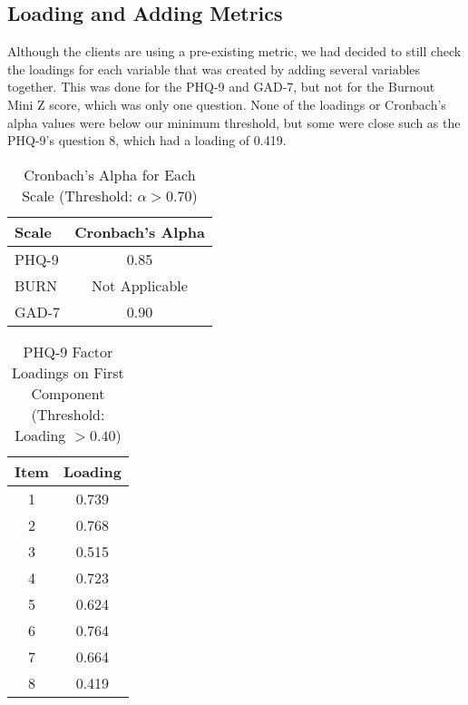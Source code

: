 \documentclass{article}
\begin{document}


\subsection{Loading and Adding Metrics}

Although the clients are using a pre-existing metric, we had decided to still check the loadings for each variable that was created by adding several variables together. This was done for the PHQ-9 and GAD-7, but not for the Burnout Mini Z score, which was only one question. None of the loadings or Cronbach's alpha values were below our minimum threshold, but some were close such as the PHQ-9's question 8, which had a loading of 0.419.

\renewcommand{\arraystretch}{1.2}
\begin{table}[H]
\centering
\caption{Cronbach's Alpha for Each Scale (Threshold: $\alpha > 0.70$)}
\begin{tabular}{|l|c|}
\hline
\textbf{Scale} & \textbf{Cronbach's Alpha} \\
\hline
PHQ-9 & 0.85 \\
BURN & Not Applicable \\
GAD-7 & 0.90 \\
\hline
\end{tabular}
\end{table}

\vspace{0.5cm}

\renewcommand{\arraystretch}{1.2}
\begin{table}[H]
\centering
\caption{PHQ-9 Factor Loadings on First Component (Threshold: Loading $> 0.40$)}
\begin{tabular}{|c|c|}
\hline
\textbf{Item} & \textbf{Loading} \\
\hline
1 & 0.739 \\
2 & 0.768 \\
3 & 0.515 \\
4 & 0.723 \\
5 & 0.624 \\
6 & 0.764 \\
7 & 0.664 \\
\rowcolor{yellow!30} 8 & 0.419 \\
\hline
\end{tabular}
\end{table}
\end{document}
